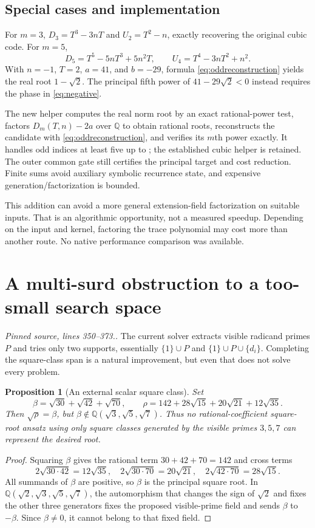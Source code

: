 \documentclass[11pt,a4paper]{article}
\newcommand{\code}[1]{\texttt{\detokenize{#1}}}
\newcommand{\Q}{\mathbb Q}\newcommand{\R}{\mathbb R}\newcommand{\C}{\mathbb C}
\newcommand{\src}[1]{\textit{Pinned source, lines #1.}}
\newtheorem{proposition}[theorem]{Proposition}
\theoremstyle{remark}\newtheorem{remark}[theorem]{Remark}
\begin{document}
\subsection{Special cases and implementation}
For $m=3$, $D_3=T^3-3nT$ and $U_2=T^2-n$, exactly recovering the original cubic code. For $m=5$,
\[
 D_5=T^5-5nT^3+5n^2T,\qquad
 U_4=T^4-3nT^2+n^2.
\]
With $n=-1$, $T=2$, $a=41$, and $b=-29$, formula \eqref{eq:oddreconstruction} yields the real root $1-\sqrt2$. The principal fifth power of $41-29\sqrt2<0$ instead requires the phase in \eqref{eq:negative}.

The new \code{quadraticOddRoots} helper computes the real norm root by an exact rational-power test, factors $D_m(T,n)-2a$ over $\Q$ to obtain rational roots, reconstructs the candidate with \eqref{eq:oddreconstruction}, and verifies its $m$th power exactly. It handles odd indices at least five up to \code{MaxRootIndex}; the established cubic helper is retained. The outer common gate still certifies the principal target and cost reduction. Finite sums avoid auxiliary symbolic recurrence state, and expensive generation/factorization is bounded.

This addition can avoid a more general extension-field factorization on suitable inputs. That is an algorithmic opportunity, not a measured speedup. Depending on the input and kernel, factoring the trace polynomial may cost more than another route. No native performance comparison was available.

\section{A multi-surd obstruction to a too-small search space}
\label{sec:coset}
\src{350--373.} The current solver extracts visible radicand primes $P$ and tries only two supports, essentially $\{1\}\cup P$ and $\{1\}\cup P\cup\{d_i\}$. Completing the square-class span is a natural improvement, but even that does not solve every problem.

\begin{proposition}[An external scalar square class]
Set
\[
 \beta=\sqrt{30}+\sqrt{42}+\sqrt{70},\qquad
 \rho=142+28\sqrt{15}+20\sqrt{21}+12\sqrt{35}.
\]
Then $\sqrt\rho=\beta$, but $\beta\notin\Q(\sqrt3,\sqrt5,\sqrt7)$. Thus no rational-coefficient square-root ansatz using only square classes generated by the visible primes $3,5,7$ can represent the desired root.
\end{proposition}
\begin{proof}
Squaring $\beta$ gives the rational term $30+42+70=142$ and cross terms
\[
 2\sqrt{30\cdot42}=12\sqrt{35},\quad
 2\sqrt{30\cdot70}=20\sqrt{21},\quad
 2\sqrt{42\cdot70}=28\sqrt{15}.
\]
All summands of $\beta$ are positive, so $\beta$ is the principal square root. In $\Q(\sqrt2,\sqrt3,\sqrt5,\sqrt7)$, the automorphism that changes the sign of $\sqrt2$ and fixes the other three generators fixes the proposed visible-prime field and sends $\beta$ to $-\beta$. Since $\beta\ne0$, it cannot belong to that fixed field.
\end{proof}
\end{document}
